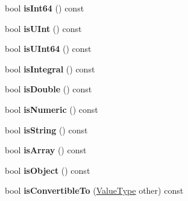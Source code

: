 \begin{DoxyCompactItemize}
\item 
bool {\bfseries is\+Int64} () const \hypertarget{class_json_1_1_value_aba89690e5fd72d0f7121a30013470423}{}\label{class_json_1_1_value_aba89690e5fd72d0f7121a30013470423}

\item 
bool {\bfseries is\+U\+Int} () const \hypertarget{class_json_1_1_value_ae814ca1796fe2d43ac09898b70213989}{}\label{class_json_1_1_value_ae814ca1796fe2d43ac09898b70213989}

\item 
bool {\bfseries is\+U\+Int64} () const \hypertarget{class_json_1_1_value_aa35efece2a6cba4d988d7d5b54db2fb8}{}\label{class_json_1_1_value_aa35efece2a6cba4d988d7d5b54db2fb8}

\item 
bool {\bfseries is\+Integral} () const \hypertarget{class_json_1_1_value_aec4f74ef7b776b1d9c8a10fc3bb4add5}{}\label{class_json_1_1_value_aec4f74ef7b776b1d9c8a10fc3bb4add5}

\item 
bool {\bfseries is\+Double} () const \hypertarget{class_json_1_1_value_a0ea567fa51fc808851698bef59b43626}{}\label{class_json_1_1_value_a0ea567fa51fc808851698bef59b43626}

\item 
bool {\bfseries is\+Numeric} () const \hypertarget{class_json_1_1_value_a8ce848900e2e8fa23a41fcc2c1409fab}{}\label{class_json_1_1_value_a8ce848900e2e8fa23a41fcc2c1409fab}

\item 
bool {\bfseries is\+String} () const \hypertarget{class_json_1_1_value_a06c01d7c1e8151a5844b595ab00f46c7}{}\label{class_json_1_1_value_a06c01d7c1e8151a5844b595ab00f46c7}

\item 
bool {\bfseries is\+Array} () const \hypertarget{class_json_1_1_value_ac8c898f93543e55b67418f94bced20af}{}\label{class_json_1_1_value_ac8c898f93543e55b67418f94bced20af}

\item 
bool {\bfseries is\+Object} () const \hypertarget{class_json_1_1_value_a80cffaa0402b80317c0437216bbb6d92}{}\label{class_json_1_1_value_a80cffaa0402b80317c0437216bbb6d92}

\item 
bool {\bfseries is\+Convertible\+To} (\hyperlink{namespace_json_a7d654b75c16a57007925868e38212b4e}{Value\+Type} other) const \hypertarget{class_json_1_1_value_a7ec153803631a27abf58cba2bb1af70c}{}\label{class_json_1_1_value_a7ec153803631a27abf58cba2bb1af70c}


\end{DoxyCompactItemize}
